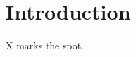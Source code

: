 \documentclass[a4paper, 10pt, twoside, openright]{book}
\begin{document}
\begin{titlepage}

\end{titlepage}

\section{Introduction}

X marks the spot.
\end{document}
